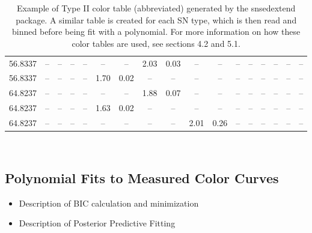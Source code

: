 \begin{table}[H]
{\begin{tabular}{@{}RCCCCCCCCCCCCCCCC@{}}
56.8337 & -- & -- & -- & -- & -- & -- & 2.03 & 0.03 & -- & -- & -- & -- & -- & -- & -- & -- \\
56.8337 & -- & -- & -- & -- & 1.70 & 0.02 & -- & -- & -- & -- & -- & -- & -- & -- & -- & -- \\
64.8237 & -- & -- & -- & -- & -- & -- & 1.88 & 0.07 & -- & -- & -- & -- & -- & -- & -- & -- \\
64.8237 & -- & -- & -- & -- & 1.63 & 0.02 & -- & -- & -- & -- & -- & -- & -- & -- & -- & -- \\
64.8237 & -- & -- & -- & -- & -- & -- & -- & -- & 2.01 & 0.26 & -- & -- & -- & -- & -- & -- \\ 
\end{tabular}%
}
\caption{Example of Type II color table (abbreviated) generated by the snsedextend package. A similar table is created for each SN type, which is then read and binned before being fit with a polynomial. For more information on how these color tables are used, see sections 4.2 and 5.1.}
\label{my-label}
\end{table}

\

\subsection{Polynomial Fits to Measured Color Curves}
\begin{itemize}
\item Description of BIC calculation and minimization
\item Description of Posterior Predictive Fitting 
\end{itemize}

\

